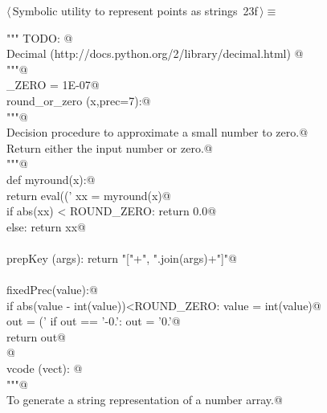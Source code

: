\documentclass[11pt,oneside]{article}	%
\begin{document}
\begin{flushleft} \small \label{scrap50}
\protect{}$\langle\,$Symbolic utility to represent points as strings\nobreak\ {\footnotesize 23f}$\,\rangle\equiv$
\vspace{-1ex}
\begin{list}{}{} \item
\mbox{}\verb@""" TODO: @\\
\mbox{}\verb@use Decimal (http://docs.python.org/2/library/decimal.html) @\\
\mbox{}\verb@"""@\\
\mbox{}\verb@ROUND_ZERO = 1E-07@\\
\mbox{}\verb@def round_or_zero (x,prec=7):@\\
\mbox{}\verb@   """@\\
\mbox{}\verb@   Decision procedure to approximate a small number to zero.@\\
\mbox{}\verb@   Return either the input number or zero.@\\
\mbox{}\verb@   """@\\
\mbox{}\verb@   def myround(x):@\\
\mbox{}\verb@      return eval(('%.'+str(prec)+'f') % round(x,prec))@\\
\mbox{}\verb@   xx = myround(x)@\\
\mbox{}\verb@   if abs(xx) < ROUND_ZERO: return 0.0@\\
\mbox{}\verb@   else: return xx@\\
\mbox{}\verb@@\\
\mbox{}\verb@def prepKey (args): return "["+", ".join(args)+"]"@\\
\mbox{}\verb@@\\
\mbox{}\verb@def fixedPrec(value):@\\
\mbox{}\verb@   if abs(value - int(value))<ROUND_ZERO: value = int(value)@\\
\mbox{}\verb@   out = ('%0.7f'% value).rstrip('0')@\\
\mbox{}\verb@   if out == '-0.': out = '0.'@\\
\mbox{}\verb@   return out@\\
\mbox{}\verb@   @\\
\mbox{}\verb@def vcode (vect): @\\
\mbox{}\verb@   """@\\
\mbox{}\verb@   To generate a string representation of a number array.@\\

\end{list}
\end{flushleft}
\end{document}

